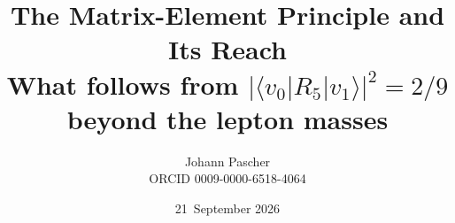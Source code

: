 \documentclass[11pt,a4paper]{report}
\title{The Matrix-Element Principle and Its Reach\\[0.5em]\large What follows from $|\langle v_0|R_5|v_1\rangle|^2 = 2/9$ beyond the lepton masses}
\date{21~September 2026}
\author{Johann Pascher\\\small ORCID 0009-0000-6518-4064}
\begin{document}
\renewcommand{\thechapter}{}
\renewcommand{\thesection}{\arabic{section}}
\maketitle
\tableofcontents

\end{document}
